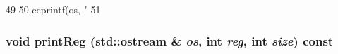 \begin{DoxyCode}
49     {
50         ccprintf(os, "  %
51     }
\end{DoxyCode}
\hypertarget{classX86ISA_1_1X86StaticInst_a895eba453d8d839cbc6ec699ceb8a698}{
\subsubsection[{printReg}]{\setlength{\rightskip}{0pt plus 5cm}void printReg (std::ostream \& {\em os}, \/  int {\em reg}, \/  int {\em size}) const}}
\label{classX86ISA_1_1X86StaticInst_a895eba453d8d839cbc6ec699ceb8a698}



